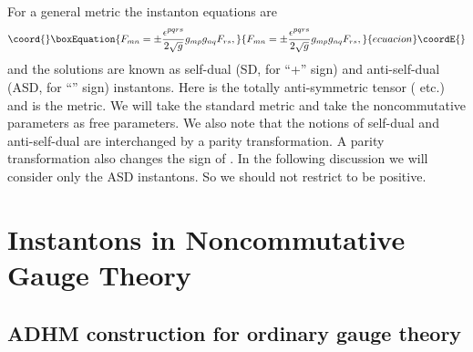 \documentclass[a4paper,a4paper]{article}
\begin{document}
For a general metric \coordHE{} the instanton equations are
\begin{equation}\coord{}\boxEquation{
\label{instanton}
F_{mn}=\pm\frac{\epsilon^{pqrs}}{2\sqrt{g}}g_{mp}g_{nq}F_{rs},
}{
F_{mn}=\pm\frac{\epsilon^{pqrs}}{2\sqrt{g}}g_{mp}g_{nq}F_{rs},
}{ecuacion}\coordE{}\end{equation}
and the solutions are known as self-dual (SD, for ``+'' sign) and
anti-self-dual (ASD, for ``\myHighlight{$-$}\coordHE{}'' sign) instantons. Here
\coordHE{} is the totally anti-symmetric tensor
(\coordHE{} etc.) and \coordHE{} is the metric. We will
take the standard metric \coordHE{} and take the
noncommutative parameters \coordHE{} as free parameters. We
also note that the notions of self-dual and anti-self-dual are
interchanged by a parity transformation. A parity transformation
also changes the sign of \coordHE{}. In the following
discussion we will consider only the ASD instantons. So we should
not restrict \coordHE{} to be positive.

\section{Instantons in Noncommutative Gauge Theory}

\subsection{ADHM construction for ordinary gauge theory}
\end{document}
